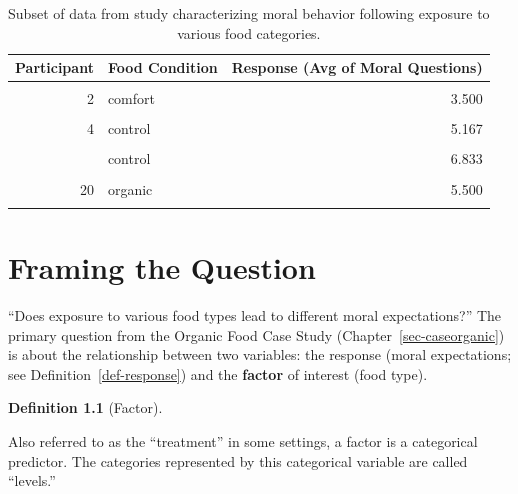 \documentclass[
  letterpaper,
  DIV=11,
  numbers=noendperiod]{scrreprt}
\theoremstyle{plain}
\theoremstyle{definition}
\theoremstyle{definition}
\newtheorem{definition}{Definition}[chapter]
\theoremstyle{remark}
\begin{document}
\hypertarget{tbl-caseorganic-table}{}
\begin{table}
\caption{\label{tbl-caseorganic-table}Subset of data from study characterizing moral behavior following
exposure to various food categories. }\tabularnewline

\centering
\begin{tabular}[t]{rlr}
\toprule
Participant & Food Condition & Response (Avg of Moral Questions)\\
\midrule
\cellcolor{gray!6}{1} & \cellcolor{gray!6}{comfort} & \cellcolor{gray!6}{6.000}\\
2 & comfort & 3.500\\
\cellcolor{gray!6}{3} & \cellcolor{gray!6}{comfort} & \cellcolor{gray!6}{6.167}\\
4 & control & 5.167\\
\cellcolor{gray!6}{10} & \cellcolor{gray!6}{control} & \cellcolor{gray!6}{7.000}\\
\addlinespace
12 & control & 6.833\\
\cellcolor{gray!6}{18} & \cellcolor{gray!6}{organic} & \cellcolor{gray!6}{5.500}\\
20 & organic & 5.500\\
\cellcolor{gray!6}{21} & \cellcolor{gray!6}{organic} & \cellcolor{gray!6}{6.333}\\
\bottomrule
\end{tabular}
\end{table}

\hypertarget{sec-anovaquestions}{%
\chapter{Framing the Question}\label{sec-anovaquestions}}

``Does exposure to various food types lead to different moral
expectations?'' The primary question from the Organic Food Case Study
(Chapter~\ref{sec-caseorganic}) is about the relationship between two
variables: the response (moral expectations; see
Definition~\ref{def-response}) and the \textbf{factor} of interest (food
type).

\begin{definition}[Factor]\protect\hypertarget{def-factor}{}\label{def-factor}

Also referred to as the ``treatment'' in some settings, a factor is a
categorical predictor. The categories represented by this categorical
variable are called ``levels.''

\end{definition}
\end{document}
